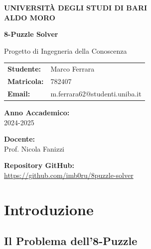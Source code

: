 \documentclass[12pt,a4paper]{report}
\theoremstyle{definition}
\newcommand{\universitylogo}{
    \begin{center}
        \Large
        \textbf{UNIVERSITÀ DEGLI STUDI DI BARI}\\
        \textbf{ALDO MORO}\\
        \vspace{2cm}
    \end{center}
}
\begin{document}
\begin{titlepage}
    \universitylogo
    
    
    \begin{center}
        {\Huge \textbf{8-Puzzle Solver}}\\
        \vspace{0.5cm}
        
        {\large Progetto di Ingegneria della Conoscenza}\\
        \vspace{2cm}
        
        \begin{tabular}{ll}
            \textbf{Studente:} & Marco Ferrara \\
            \textbf{Matricola:} & 782407 \\
            \textbf{Email:} & m.ferrara62@studenti.uniba.it \\
        \end{tabular}
        
        \vspace{2cm}
        
        \textbf{Anno Accademico:}\\
        2024-2025\\
        
        \vspace{1cm}
        
        \textbf{Docente:}\\
        Prof. Nicola Fanizzi\\
        
        \vspace{2cm}
        
        \textbf{Repository GitHub:}\\
        \url{https://github.com/imb0ru/8puzzle-solver}
    \end{center}
\end{titlepage}

\tableofcontents
\newpage

\chapter{Introduzione}

\section{Il Problema dell'8-Puzzle}
\end{document}
